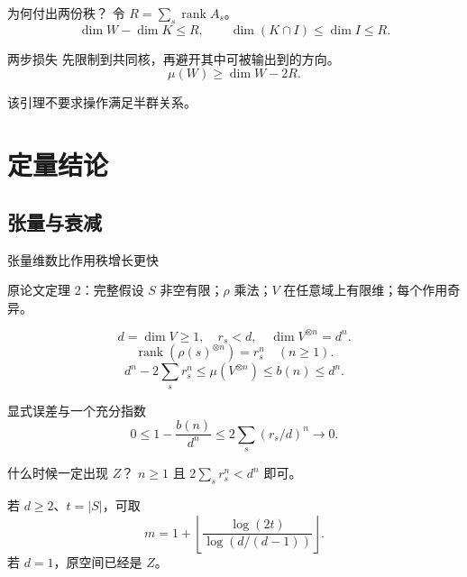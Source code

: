 \documentclass{beamer}
\begin{document}
\begin{frame}{为何付出两份秩？}
令 $R=\sum_s\operatorname{rank}A_s$。
\[
\dim W-\dim K\leq R,\qquad\dim(K\cap I)\leq\dim I\leq R.
\]
\begin{block}{两步损失}
先限制到共同核，再避开其中可被输出到的方向。
\[
\mu(W)\geq\dim W-2R.
\]
\end{block}
该引理不要求操作满足半群关系。
\end{frame}
\section{定量结论}
\subsection{张量与衰减}
\begin{frame}{张量维数比作用秩增长更快}
\begin{block}{原论文定理 2：完整假设}
$S$ 非空有限；$\rho$ 乘法；$V$ 在任意域上有限维；每个作用奇异。
\end{block}
\[
d=\dim V\geq1,\quad r_s<d,\quad
\dim V^{\otimes n}=d^n.
\]
\[
\operatorname{rank}(\rho(s)^{\otimes n})=r_s^n\quad(n\geq1).
\]
\[
\boxed{d^n-2\sum_sr_s^n\leq\mu(V^{\otimes n})\leq b(n)\leq d^n.}
\]
\end{frame}
\begin{frame}{显式误差与一个充分指数}
\[
0\leq1-\frac{b(n)}{d^n}\leq2\sum_s(r_s/d)^n\longrightarrow0.
\]
\begin{block}{什么时候一定出现 $Z$？}
$n\geq1$ 且 $2\sum_sr_s^n<d^n$ 即可。
\end{block}
若 $d\geq2$、$t=|S|$，可取
\[
m=1+\left\lfloor\frac{\log(2t)}{\log(d/(d-1))}\right\rfloor.
\]
若 $d=1$，原空间已经是 $Z$。
\end{frame}
\end{document}
